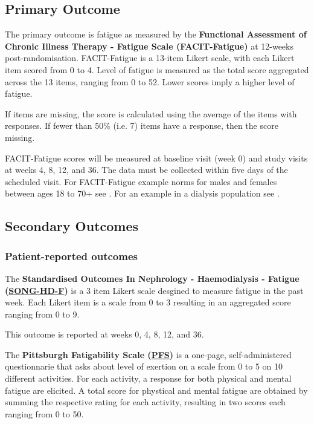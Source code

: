 \documentclass[11pt,parskip=half-]{scrartcl}
\begin{document}
\subsection{Primary Outcome}\label{primary-outcome}

The primary outcome is fatigue as measured by the \textbf{Functional Assessment of Chronic Illness Therapy - Fatigue Scale (FACIT-Fatigue)} \cites{yellen1997measuring}{cella2002fatigue} at 12-weeks post-randomisation. FACIT-Fatigue is a 13-item Likert scale, with each Likert item scored from 0 to 4. Level of fatigue is measured as the total score aggregated across the 13 items, ranging from 0 to 52. Lower scores imply a higher level of fatigue.

If items are missing, the score is calculated using the average of the items with responses. If fewer than 50\% (i.e. 7) items have a response, then the score missing.

FACIT-Fatigue scores will be measured at baseline visit (week 0) and study visits at weeks 4, 8, 12, and 36. The data must be collected within five days of the scheduled visit. For FACIT-Fatigue example norms for males and females between ages 18 to 70+ see \cite{montan2018general}. For an example in a dialysis population see \cite{wang2015psychometric}.

\subsection{Secondary Outcomes}\label{secondary-outcomes}

\subsubsection{Patient-reported outcomes}\label{pro-outcomes}

\label{outcome:song-hd-f}
The \textbf{Standardised Outcomes In Nephrology - Haemodialysis - Fatigue (\hyperref[analysis:song-hd-f]{SONG-HD-F})} \cite{ju2018establishing} is a 3 item Likert scale desgined to measure fatigue in the past week. Each Likert item is a scale from 0 to 3 resulting in an aggregated score ranging from 0 to 9.

This outcome is reported at weeks 0, 4, 8, 12, and 36.

\label{outcome:pfs}
The \textbf{Pittsburgh Fatigability Scale (\hyperref[analysis:pfs]{PFS})} \cite{glynn2015pittsburgh} is a one-page, self-administered questionnarie that asks about level of exertion on a scale from 0 to 5 on 10 different activities. For each activity, a response for both physical and mental fatigue are elicited. A total score for phystical and mental fatigue are obtained by summing the respective rating for each activity, resulting in two scores each ranging from 0 to 50.
\end{document}
